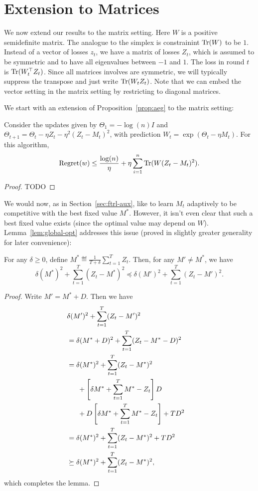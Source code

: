 \documentclass[paper_icml.tex]{subfiles}
\begin{document}
\section{Extension to Matrices} 
\label{sec:matrix}
We now extend our results to the matrix setting. Here $W$ is a positive semidefinite 
matrix. The analogue to the simplex is constrainint $\operatorname{Tr}(W)$ to be $1$. Instead of a vector 
of losses $z_t$, we have a matrix of losses $Z_t$, which is assumed to be symmetric and to 
have all eigenvalues between $-1$ and $1$. The loss in round $t$ is $\operatorname{Tr}(W_t^{\top}Z_t)$. 
Since all matrices involves are symmetric, we will typically suppress the transpose and 
just write $\operatorname{Tr}(W_tZ_t)$. Note that we can embed the vector setting in the matrix setting 
by restricting to diagonal matrices.

We start with an extension of Proposition~\ref{prop:aeg} to the matrix setting:
\begin{proposition}
\label{prop:maeg}
Consider the updates given by $\Theta_1 = -\log(n)I$ and 
$\Theta_{t+1} = \Theta_t - \eta Z_t - \eta^2 (Z_t - M_t)^2$, 
with prediction $W_t = \exp(\Theta_t - \eta M_t)$. For this algorithm,
\begin{equation}
\operatorname{Regret}(w) \leq \frac{\log(n)}{\eta} + \eta \sum_{i=1}^n \operatorname{Tr}(W(Z_t-M_t)^2).
\end{equation}
\end{proposition}
\begin{proof}
TODO
\end{proof}
We would now, as in Section~\ref{sec:ftrl-aux}, like to learn $M_t$ adaptively 
to be competitive with the best fixed value $M^*$. However, it isn't even clear 
that such a best fixed value exists (since the optimal value may depend on $W$). 
Lemma~\ref{lem:global-opt} addresses this issue (proved in slightly greater 
generality for later convenience):
\begin{lemma}
\label{lem:global-opt}
For any $\delta \geq 0$, define $M^* \eqdef \frac{1}{T+\delta} \sum_{t=1}^T Z_t$. Then, for 
any $M' \neq M^*$, we have
\[ \delta (M^*)^2 + \sum_{t=1}^T (Z_t-M^*)^2 \preceq \delta (M')^2 + \sum_{t=1}^T (Z_t-M')^2. \]
\end{lemma}
\begin{proof}
Write $M' = M^* + D$. Then we have
\begin{align}
\lefteqn{\delta(M')^2 + \sum_{t=1}^T (Z_t - M')^2} \\
 &= \delta(M^*+D)^2 + \sum_{t=1}^T (Z_t - M^* - D)^2 \\
 &= \delta(M^*)^2 + \sum_{t=1}^T (Z_t - M^*)^2 \\
\nonumber
 &\phantom{==} + \left[\delta M^* + \sum_{t=1}^T M^*-Z_t\right]D \\
\nonumber
 &\phantom{==} + D\left[\delta M^* + \sum_{t=1}^T M^*-Z_t\right] + TD^2 \\
 &= \delta(M^*)^2 + \sum_{t=1}^T (Z_t-M^*)^2 + TD^2 \\
 &\succeq \delta(M^*)^2 + \sum_{t=1}^T (Z_t-M^*)^2,
\end{align}
which completes the lemma.
\end{proof}
\end{document}
